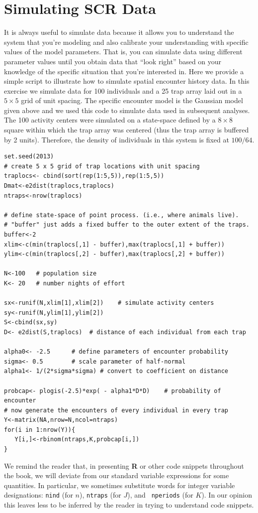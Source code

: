 \section{Simulating SCR Data}
\label{scr0.sec.simulating}

It is always useful to simulate data because it allows you to
understand the system that you're modeling and also calibrate your
understanding with specific values of the model parameters.
That is, you can
simulate data using different parameter values until you obtain data
that ``look right'' based on your knowledge of the specific situation
that you're interested in. Here we provide a simple script to
illustrate how to simulate spatial encounter history data. In this
exercise we simulate data for 100 individuals and a 25 trap array laid
out in a $5 \times 5$ grid of unit spacing.  The specific encounter
model is the Gaussian model given above and we used this code to
simulate data used in subsequent analyses.  The 100 activity centers
were simulated on a state-space defined by a $8 \times 8$ square
within which the trap array was centered (thus the trap array is
buffered by 2 units). Therefore, the density of individuals in this
system is fixed at $100/64$.

{\small
\begin{verbatim}
set.seed(2013)
# create 5 x 5 grid of trap locations with unit spacing
traplocs<- cbind(sort(rep(1:5,5)),rep(1:5,5))
Dmat<-e2dist(traplocs,traplocs)
ntraps<-nrow(traplocs)

# define state-space of point process. (i.e., where animals live).
# "buffer" just adds a fixed buffer to the outer extent of the traps.
buffer<-2
xlim<-c(min(traplocs[,1] - buffer),max(traplocs[,1] + buffer))
ylim<-c(min(traplocs[,2] - buffer),max(traplocs[,2] + buffer))

N<-100   # population size
K<- 20   # number nights of effort

sx<-runif(N,xlim[1],xlim[2])    # simulate activity centers
sy<-runif(N,ylim[1],ylim[2])
S<-cbind(sx,sy)
D<- e2dist(S,traplocs)  # distance of each individual from each trap

alpha0<- -2.5      # define parameters of encounter probability
sigma<- 0.5        # scale parameter of half-normal
alpha1<- 1/(2*sigma*sigma) # convert to coefficient on distance

probcap<- plogis(-2.5)*exp( - alpha1*D*D)    # probability of encounter
# now generate the encounters of every individual in every trap
Y<-matrix(NA,nrow=N,ncol=ntraps)
for(i in 1:nrow(Y)){
   Y[i,]<-rbinom(ntraps,K,probcap[i,])
}
\end{verbatim}
}
We remind the reader that, in presenting {\bf R} or other code snippets
throughout the book, we will deviate from our standard variable
expressions for some quantities.
In particular, we sometimes
substitute words for integer variable designations:
\mbox{\tt nind} (for $n$), \mbox{\tt ntraps} (for $J$), and \mbox{\tt
 nperiods} (for $K$). In our opinion this leaves less to be inferred
by the reader in trying to understand code snippets.

